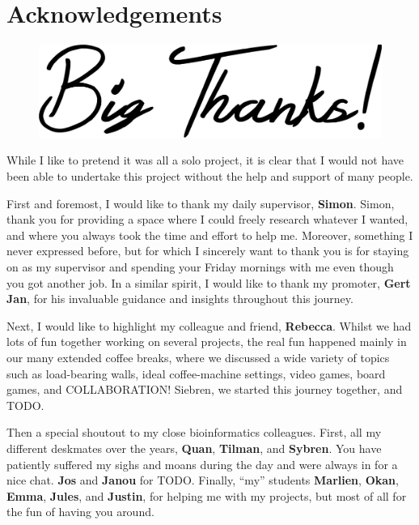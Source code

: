 \section{Acknowledgements}

\vspace*{\fill}
\begin{figure}[H]
    \center
    \includegraphics[width=0.8\linewidth]{ch.appendix/imgs/bigthanks.png}
\end{figure}
\vspace*{\fill}

\newpage

\noindent
While I like to pretend it was all a solo project, it is clear that I would not have been able to undertake this project without the help and support of many people.

\bigbreak \noindent
First and foremost, I would like to thank my daily supervisor, \textbf{Simon}. Simon, thank you for providing a space where I could freely research whatever I wanted, and where you always took the time and effort to help me. Moreover, something I never expressed before, but for which I sincerely want to thank you is for staying on as my supervisor and spending your Friday mornings with me even though you got another job. In a similar spirit, I would like to thank my promoter, \textbf{Gert Jan}, for his invaluable guidance and insights throughout this journey.

\bigbreak \noindent
Next, I would like to highlight my colleague and friend, \textbf{Rebecca}. Whilst we had lots of fun together working on several projects, the real fun happened mainly in our many extended coffee breaks, where we discussed a wide variety of topics such as load-bearing walls, ideal coffee-machine settings, video games, board games, and COLLABORATION! Siebren, we started this journey together, and TODO.

\bigbreak \noindent
Then a special shoutout to my close bioinformatics colleagues. First, all my different deskmates over the years, \textbf{Quan}, \textbf{Tilman}, and \textbf{Sybren}. You have patiently suffered my sighs and moans during the day and were always in for a nice chat. \textbf{Jos} and \textbf{Janou} for TODO. Finally, “my” students \textbf{Marlien}, \textbf{Okan}, \textbf{Emma}, \textbf{Jules}, and \textbf{Justin}, for helping me with my projects, but most of all for the fun of having you around. 

